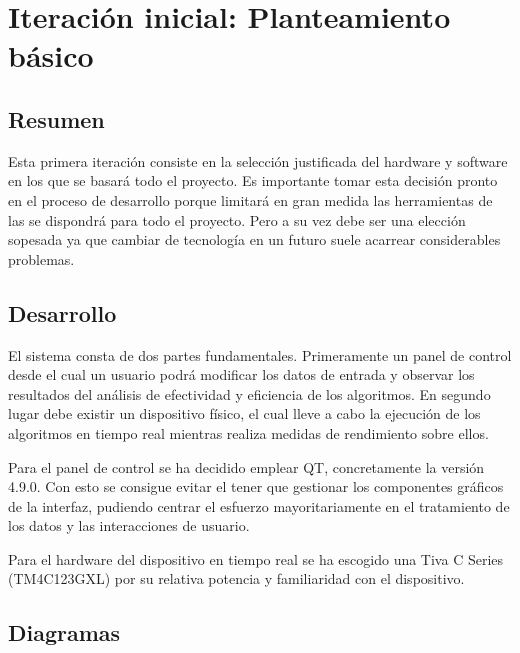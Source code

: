 
\section{Iteración inicial: Planteamiento básico}
        \subsection{Resumen}
        
        Esta primera iteración consiste en la selección justificada del hardware y software en los que se basará todo el proyecto. Es importante tomar esta decisión pronto en el proceso de desarrollo porque limitará en gran medida las herramientas de las se dispondrá para todo el proyecto. Pero a su vez debe ser una elección sopesada ya que cambiar de tecnología en un futuro suele acarrear considerables problemas.
        
        \subsection{Desarrollo}

        El sistema consta de dos partes fundamentales. Primeramente un panel de control desde el cual un usuario podrá modificar los datos de entrada y observar los resultados del análisis de efectividad y eficiencia de los algoritmos. En segundo lugar debe existir un dispositivo físico, el cual lleve a cabo la ejecución de los algoritmos en tiempo real mientras realiza medidas de rendimiento sobre ellos.

        Para el panel de control se ha decidido emplear QT, concretamente la versión 4.9.0. Con esto se consigue evitar el tener que gestionar los componentes gráficos de la interfaz, pudiendo centrar el esfuerzo mayoritariamente en el tratamiento de los datos y las interacciones de usuario.
        
        Para el hardware del dispositivo en tiempo real se ha escogido una Tiva C Series (TM4C123GXL) por su relativa potencia y familiaridad con el dispositivo.        

        \subsection{Diagramas}

